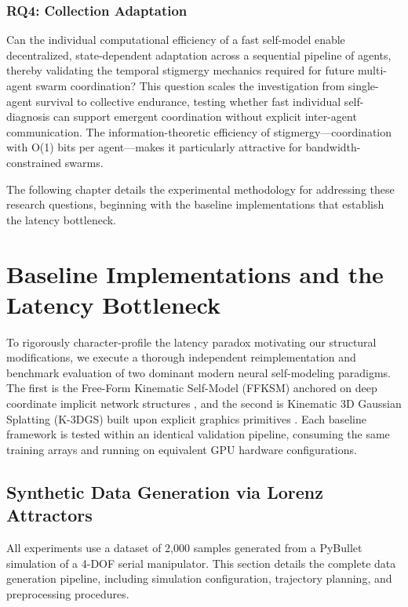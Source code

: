 \documentclass[12pt,a4paper,oneside]{report}
\begin{document}
\subsection{RQ4: Collection Adaptation}
\label{subsec:rq4_collective_adaptation}

Can the individual computational efficiency of a fast self-model enable decentralized, state-dependent adaptation across a sequential pipeline of agents, thereby validating the temporal stigmergy mechanics required for future multi-agent swarm coordination? This question scales the investigation from single-agent survival to collective endurance, testing whether fast individual self-diagnosis can support emergent coordination without explicit inter-agent communication. The information-theoretic efficiency of stigmergy---coordination with O(1) bits per agent---makes it particularly attractive for bandwidth-constrained swarms.

The following chapter details the experimental methodology for addressing these research questions, beginning with the baseline implementations that establish the latency bottleneck.
\clearpage


\chapter{Baseline Implementations and the Latency Bottleneck}
\label{chap:baseline_latency_bottleneck}

To rigorously character-profile the latency paradox motivating our structural modifications, we execute a thorough independent reimplementation and benchmark evaluation of two dominant modern neural self-modeling paradigms. The first is the Free-Form Kinematic Self-Model (FFKSM) anchored on deep coordinate implicit network structures \cite{hu2024teaching}, and the second is Kinematic 3D Gaussian Splatting (K-3DGS) built upon explicit graphics primitives \cite{hu2025learning}. Each baseline framework is tested within an identical validation pipeline, consuming the same training arrays and running on equivalent GPU hardware configurations.
\section{Synthetic Data Generation via Lorenz Attractors}

All experiments use a dataset of 2,000 samples generated from a PyBullet simulation of a 4-DOF serial manipulator. This section details the complete data generation pipeline, including simulation configuration, trajectory planning, and preprocessing procedures.
\end{document}
